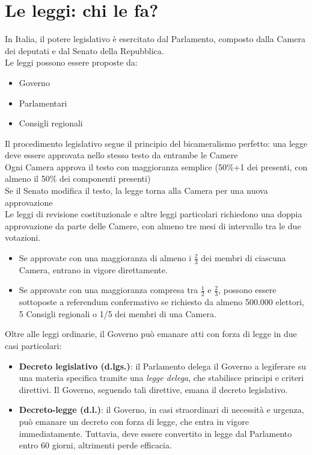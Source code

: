 \documentclass[8pt,oneside,a4paper]{article}
\begin{document}
	\section{Le leggi: chi le fa?}
	In Italia, il potere legislativo è esercitato dal Parlamento, composto dalla Camera dei deputati e dal Senato della Repubblica.  \\
	Le leggi possono essere proposte da:  
	\begin{itemize}
		\item Governo  
		\item Parlamentari  
		\item Consigli regionali
	\end{itemize}
	Il procedimento legislativo segue il principio del bicameralismo perfetto: una legge deve essere approvata nello stesso testo da entrambe le Camere\\  
	Ogni Camera approva il testo con maggioranza semplice (50\%+1 dei presenti, con almeno il 50\% dei componenti presenti)\\
	Se il Senato modifica il testo, la legge torna alla Camera per una nuova approvazione\\
	Le leggi di revisione costituzionale e altre leggi particolari richiedono una doppia approvazione da parte delle Camere, con almeno tre mesi di intervallo tra le due votazioni. 
	\begin{itemize}
		\item Se approvate con una maggioranza di almeno i \(\frac{2}{3}\) dei membri di ciascuna Camera, entrano in vigore direttamente.  
		\item Se approvate con una maggioranza compresa tra \(\frac{1}{2}\) e \(\frac{2}{3}\), possono essere sottoposte a referendum confermativo se richiesto da almeno 500.000 elettori, 5 Consigli regionali o 1/5 dei membri di una Camera.  
	\end{itemize}
	Oltre alle leggi ordinarie, il Governo può emanare atti con forza di legge in due casi particolari:  
	\begin{itemize}
		\item \textbf{Decreto legislativo (d.lgs.)}: il Parlamento delega il Governo a legiferare su una materia specifica tramite una \textit{legge delega}, che stabilisce principi e criteri direttivi. Il Governo, seguendo tali direttive, emana il decreto legislativo.  
		\item \textbf{Decreto-legge (d.l.)}: il Governo, in casi straordinari di necessità e urgenza, può emanare un decreto con forza di legge, che entra in vigore immediatamente. Tuttavia, deve essere convertito in legge dal Parlamento entro 60 giorni, altrimenti perde efficacia.  
	\end{itemize}
\end{document}
